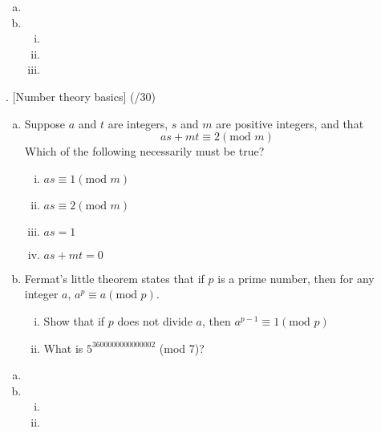 \documentclass[11pt]{article}
\newenvironment{solution}{\begin{mdframed}[skipabove=\baselineskip,innertopmargin=\baselineskip,innerbottommargin=\baselineskip]
  }{\end{mdframed}}
\begin{document}
\begin{solution}
\begin{enumerate}[(a)]
    \item
    \item \begin{enumerate}[(i)]
        \item
        \item
        \item
    \end{enumerate}
\end{enumerate}
\end{solution}

\newpage

. [Number theory basics] (/30)

\begin{enumerate}[(a)]
\item Suppose $a$ and $t$ are integers, $s$ and $m$ are positive integers, and that $$as+mt\equiv2(\text{mod }m)$$
Which of the following necessarily must be true?
    \begin{enumerate}[(i)]
    \item $as \equiv 1 (\text{mod }m)$ 
    \item $as \equiv 2 (\text{mod }m)$ 
    \item $as=1$
    \item $as+mt=0$
    \end{enumerate}
\item Fermat's little theorem states that if $p$ is a prime number, then for any integer $a$, $a^p\equiv a(\text{mod }p)$.
    \begin{enumerate}[(i)]
    \item Show that if $p$ does not divide $a$, then $a^{p-1}\equiv 1(\text{mod }p)$
    \item What is $5^{3600000000000002}$ (mod 7)?
    \end{enumerate}
\end{enumerate}

\begin{solution}
\begin{enumerate}[(a)]
\item 
\item 
    \begin{enumerate}[(i)]
    \item 
    \item 
    \end{enumerate}
\end{enumerate}
\end{solution}
\end{document}
